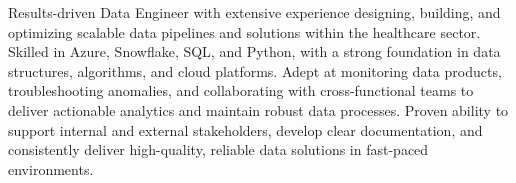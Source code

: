 \begin{onecolentry}
    Results-driven Data Engineer with extensive experience designing, building, and optimizing scalable data pipelines and solutions within the healthcare sector. Skilled in Azure, Snowflake, SQL, and Python, with a strong foundation in data structures, algorithms, and cloud platforms. Adept at monitoring data products, troubleshooting anomalies, and collaborating with cross-functional teams to deliver actionable analytics and maintain robust data processes. Proven ability to support internal and external stakeholders, develop clear documentation, and consistently deliver high-quality, reliable data solutions in fast-paced environments.
\end{onecolentry}